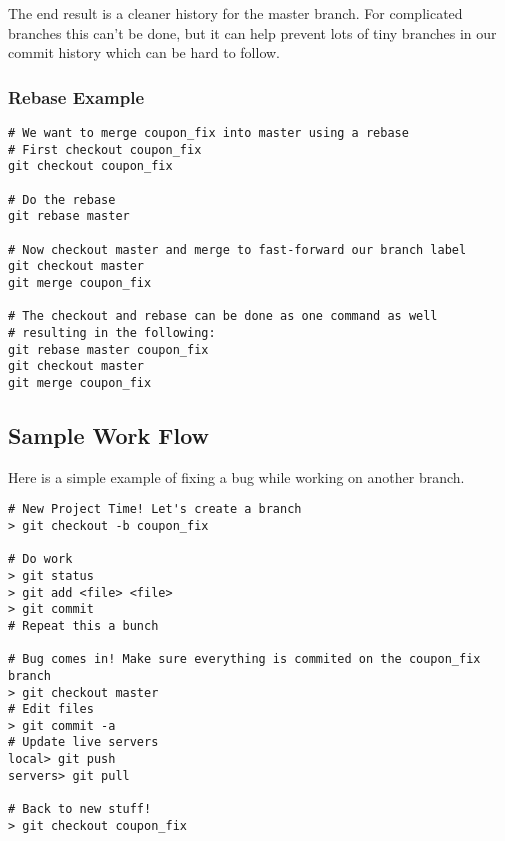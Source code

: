 \documentclass[letterpaper,12pt]{article}
\begin{document}
The end result is a cleaner history for the master branch. For complicated
branches this can't be done, but it can help prevent lots of tiny branches in
our commit history which can be hard to follow.

\subsubsection{Rebase Example}

\begin{verbatim}
# We want to merge coupon_fix into master using a rebase
# First checkout coupon_fix
git checkout coupon_fix

# Do the rebase
git rebase master

# Now checkout master and merge to fast-forward our branch label
git checkout master
git merge coupon_fix

# The checkout and rebase can be done as one command as well
# resulting in the following:
git rebase master coupon_fix
git checkout master
git merge coupon_fix
\end{verbatim}

\subsection{Sample Work Flow}
Here is a simple example of fixing a bug while working on another branch.

\begin{verbatim}
# New Project Time! Let's create a branch
> git checkout -b coupon_fix

# Do work
> git status
> git add <file> <file>
> git commit
# Repeat this a bunch

# Bug comes in! Make sure everything is commited on the coupon_fix branch
> git checkout master
# Edit files
> git commit -a
# Update live servers
local> git push
servers> git pull

# Back to new stuff!
> git checkout coupon_fix
\end{verbatim}
\end{document}
